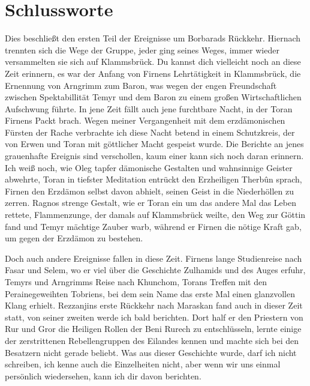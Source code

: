 \documentclass[11pt]{scrreprt}
\begin{document}
\chapter{Schlussworte}
Dies beschließt den ersten Teil der Ereignisse um Borbarads Rückkehr. Hiernach trennten sich die Wege der Gruppe, jeder ging seines Weges, immer wieder versammelten sie sich auf Klammsbrück. Du kannst dich vielleicht noch an diese Zeit erinnern, es war der Anfang von Firnens Lehrtätigkeit in Klammsbrück, die Ernennung von Arngrimm zum Baron, was wegen der engen Freundschaft zwischen Spektabillität Temyr und dem Baron zu einem großen Wirtschaftlichen Aufschwung führte. In jene Zeit fällt auch jene furchtbare Nacht, in der Toran Firnens Packt brach. Wegen meiner Vergangenheit mit dem erzdämonischen Fürsten der Rache verbrachte ich diese Nacht betend in einem Schutzkreis, der von Erwen und Toran mit göttlicher Macht gespeist wurde. Die Berichte an jenes grauenhafte Ereignis sind verschollen, kaum einer kann sich noch daran erinnern. Ich weiß noch, wie Oleg tapfer dämonische Gestalten und wahnsinnige Geister abwehrte, Toran in tiefster Meditation entrückt den Erzheiligen Therbûn sprach, Firnen den Erzdämon selbst davon abhielt, seinen Geist in die Niederhöllen zu zerren. Ragnos strenge Gestalt, wie er Toran ein um das andere Mal das Leben rettete, Flammenzunge, der damals auf Klammsbrück weilte, den Weg zur Göttin fand und Temyr mächtige Zauber warb, während er Firnen die nötige Kraft gab, um gegen der Erzdämon zu bestehen.\par
Doch auch andere Ereignisse fallen in diese Zeit. Firnens lange Studienreise nach Fasar und Selem, wo er viel über die Geschichte Zulhamids und des Auges erfuhr, Temyrs und Arngrimms Reise nach Khunchom, Torans Treffen mit den Perainegeweihten Tobriens, bei dem sein Name das erste Mal einen glanzvollen Klang erhielt. Rezzanjins erste Rückkehr nach Maraskan fand auch in dieser Zeit statt, von seiner zweiten werde ich bald berichten. Dort half er den Priestern von Rur und Gror die Heiligen Rollen der Beni Rurech zu entschlüsseln, lernte einige der zerstrittenen Rebellengruppen des Eilandes kennen und machte sich bei den Besatzern nicht gerade beliebt. Was aus dieser Geschichte wurde, darf ich nicht schreiben, ich kenne auch die Einzelheiten nicht, aber wenn wir uns einmal persönlich wiedersehen, kann ich dir davon berichten.
\end{document}
